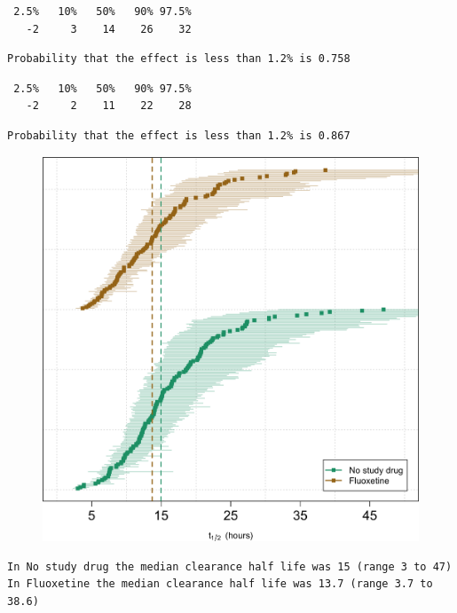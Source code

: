 \documentclass[
  letterpaper,
  DIV=11,
  numbers=noendperiod]{scrartcl}
\begin{document}
\begin{verbatim}
 2.5%   10%   50%   90% 97.5% 
   -2     3    14    26    32 
\end{verbatim}

\begin{verbatim}
Probability that the effect is less than 1.2% is 0.758
\end{verbatim}

\begin{verbatim}
 2.5%   10%   50%   90% 97.5% 
   -2     2    11    22    28 
\end{verbatim}

\begin{verbatim}
Probability that the effect is less than 1.2% is 0.867
\end{verbatim}

\begin{figure}[H]

{\centering \includegraphics{Fluoxetine_analysis_files/figure-pdf/slopes_plot-1.png}

}

\end{figure}

\begin{verbatim}
In No study drug the median clearance half life was 15 (range 3 to 47)
In Fluoxetine the median clearance half life was 13.7 (range 3.7 to 38.6)
\end{verbatim}
\end{document}
